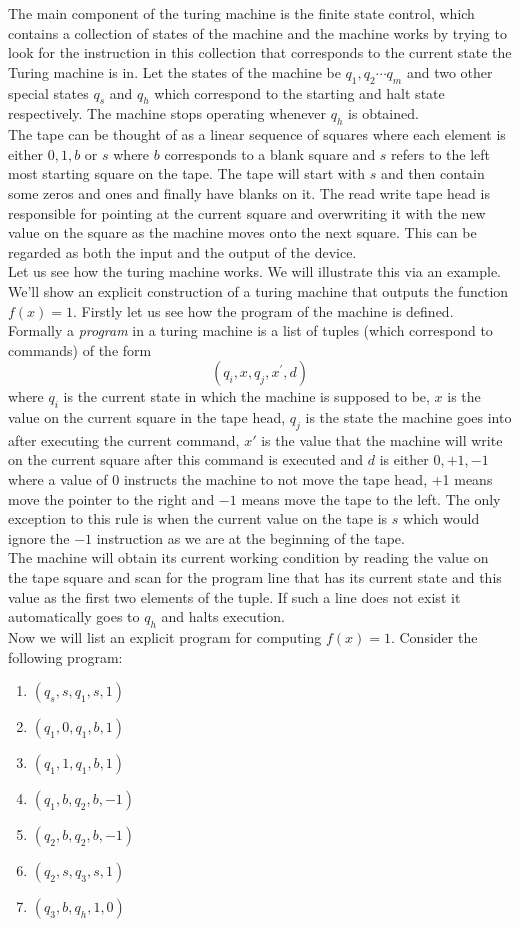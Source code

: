 The main component of the turing machine is the finite state control, which contains a collection of states of the machine and the machine works by trying to look for the instruction in this collection that corresponds to the current state the Turing machine is in.
Let the states of the machine be $q_1, q_2 \cdots q_m$ and two other special states $q_s$ and $q_h$ which correspond to the starting and halt state respectively. The machine stops operating whenever $q_h$ is obtained. \\ The tape can be thought of as a linear sequence of squares where each element is either $0, 1, b$ or $s$ where $b$ corresponds to a blank square and $s$ refers to the left most starting square on the tape. The tape will start with $s$ and then contain some zeros and ones and finally have blanks on it. The read write tape head is responsible for pointing at the current square and overwriting it with the new value on the square as the machine moves onto the next square. This can be regarded as both the input and the output of the device. 
\\ Let us see how the turing machine works. We will illustrate this via an example. We'll show an explicit construction of a turing machine that outputs the function $f(x) = 1$.
Firstly let us see how the program of the machine is defined. Formally a \textit{program} in a turing machine is a list of tuples (which correspond to commands) of the form 
$$ \left( q_i, x, q_j, x^{'}, d \right)$$
where $q_i$ is the current state in which the machine is supposed to be, $x$ is the value on the current square in the tape head, $q_j$ is the state the machine goes into after executing the current command, $x'$ is the value that the machine will write on the current square after this command is executed and $d$ is either $0, +1, -1$ where a value of $0$ instructs the machine to not move the tape head, +1 means move the pointer to the right and $-1$ means move the tape to the left. The only exception to this rule is when the current value on the tape is $s$ which would ignore the $-1$ instruction as we are at the beginning of the tape.
\\The machine will obtain its current working condition by reading the value on the tape square and scan for the program line that has its current state and this value as the first two elements of the tuple. If such a line does not exist it automatically goes to $q_h$ and halts execution.
\\ Now we will list an explicit program for computing $f(x)=1$.
Consider the following program:
\begin{enumerate}
    \item $ \left( q_s, s, q_1, s, 1 \right)$
    \item $ \left( q_1, 0, q_1, b, 1 \right)$
    \item $ \left( q_1, 1, q_1, b, 1 \right)$
    \item $ \left( q_1, b, q_2, b, -1 \right)$
    \item $ \left( q_2, b, q_2, b, -1 \right)$
    \item $ \left( q_2, s, q_3, s, 1 \right)$
    \item $ \left( q_3, b, q_h, 1, 0 \right)$
\end{enumerate}


